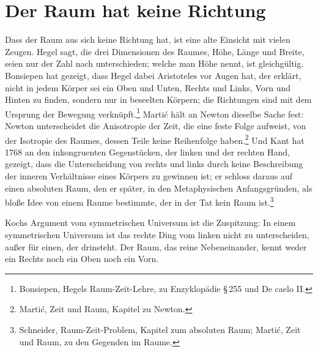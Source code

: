 \section{Der Raum hat keine Richtung}

Dass der Raum aus sich keine Richtung hat, ist eine alte Einsicht mit vielen Zeugen. Hegel sagt, die drei Dimensionen des Raumes, Höhe, Länge und Breite, seien nur der Zahl nach unterschieden; welche man Höhe nennt, ist gleichgültig. Bonsiepen hat gezeigt, dass Hegel dabei Aristoteles vor Augen hat, der erklärt, nicht in jedem Körper sei ein Oben und Unten, Rechts und Links, Vorn und Hinten zu finden, sondern nur in beseelten Körpern; die Richtungen sind mit dem Ursprung der Bewegung verknüpft.\footnote{Bonsiepen, Hegels Raum-Zeit-Lehre, zu Enzyklopädie \S\,255 und De caelo II.} Martić hält an Newton dieselbe Sache fest: Newton unterscheidet die Anisotropie der Zeit, die eine feste Folge aufweist, von der Isotropie des Raumes, dessen Teile keine Reihenfolge haben.\footnote{Martić, Zeit und Raum, Kapitel zu Newton.} Und Kant hat 1768 an den inkongruenten Gegenstücken, der linken und der rechten Hand, gezeigt, dass die Unterscheidung von rechts und links durch keine Beschreibung der inneren Verhältnisse eines Körpers zu gewinnen ist; er schloss daraus auf einen absoluten Raum, den er später, in den Metaphysischen Anfangsgründen, als bloße Idee von einem Raume bestimmte, der in der Tat kein Raum ist.\footnote{Schneider, Raum-Zeit-Problem, Kapitel zum absoluten Raum; Martić, Zeit und Raum, zu den Gegenden im Raume.}

Kochs Argument vom symmetrischen Universum ist die Zuspitzung: In einem symmetrischen Universum ist das rechte Ding vom linken nicht zu unterscheiden, außer für einen, der drinsteht. Der Raum, das reine Nebeneinander, kennt weder ein Rechts noch ein Oben noch ein Vorn.

